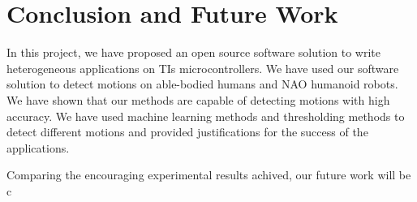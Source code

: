 \documentclass[letterpaper]{article}
\begin{document}
\section{Conclusion and Future Work}

In this project, we have proposed an open source software solution to write heterogeneous
applications on TIs microcontrollers. We have used our software solution to detect motions on
able-bodied humans and NAO humanoid robots. We have shown that our methods are capable of detecting
motions with high accuracy. We have used machine learning methods and thresholding methods to
detect different motions and provided justifications for the success of the applications. 

\par
Comparing the encouraging experimental results achived, our future work will be c



\end{document}
